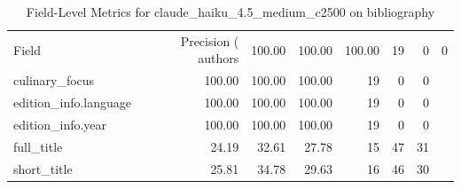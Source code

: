 \begin{table}
\caption{Field-Level Metrics for claude_haiku_4.5_medium_c2500 on bibliography}
\label{tab:fields_claude_haiku_4.5_medium_c2500_bibliography}
\begin{tabular}{lrrrrrr}
\toprule
Field & Precision (%
\midrule
authors & 100.00 & 100.00 & 100.00 & 19 & 0 & 0 \\
culinary_focus & 100.00 & 100.00 & 100.00 & 19 & 0 & 0 \\
edition_info.language & 100.00 & 100.00 & 100.00 & 19 & 0 & 0 \\
edition_info.year & 100.00 & 100.00 & 100.00 & 19 & 0 & 0 \\
full_title & 24.19 & 32.61 & 27.78 & 15 & 47 & 31 \\
short_title & 25.81 & 34.78 & 29.63 & 16 & 46 & 30 \\
\bottomrule
\end{tabular}
\end{table}
